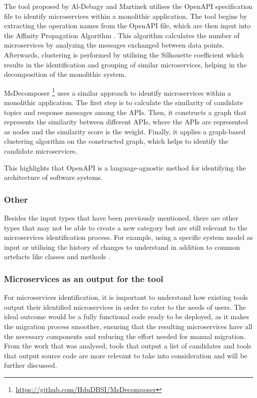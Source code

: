 The tool proposed by Al-Debagy and Martinek  utilises the
OpenAPI specification file to identify microservices within a monolithic
application. The tool begins by extracting the operation names from the OpenAPI
file, which are then input into the Affinity Propagation Algorithm
\cite{frey2007clustering}. This algorithm calculates the number of
microservices by analyzing the messages exchanged between data points.
Afterwards, clustering is performed by utilising the Silhouette coefficient
\cite{rousseeuw1987silhouettes} which results in the identification and
grouping of similar microservices, helping in the decomposition of the
monolithic system.

MsDecomposer \footnote{\url{https://github.com/HduDBSI/MsDecomposer}}
 uses a similar approach to identify microservices
within a monolithic application. The first step is to calculate the similarity
of candidate topics and response messages among the APIs. Then, it constructs a
graph that represents the similarity between different APIs, where the APIs are
represented as nodes and the similarity score is the weight. Finally, it
applies a graph-based clustering algorithm on the constructed graph, which
helps to identify the candidate microservices.

This highlights that OpenAPI is a language-agnostic method for identifying the
architecture of software systems.

\subsubsection*{Other}

Besides the input types that have been previously mentioned, there are other
types that may not be able to create a new category but are still relevant to
the microservices identification process. For example, using a specific system
model as input  or utilising the history of changes
to understand in addition to common artefacts like classes and methods
.

\subsubsection{Microservices as an output for the tool}

For microservices identification, it is important to understand how existing
tools output their identified microservices in order to cater to the needs of
users. The ideal outcome would be a fully functional code ready to be deployed,
as it makes the migration process smoother, ensuring that the resulting
microservices have all the necessary components and reducing the effort needed
for manual migration. From the work that was analysed, tools that output a list
of candidates and tools that output source code are more relevant to take into
consideration and will be further discussed.

